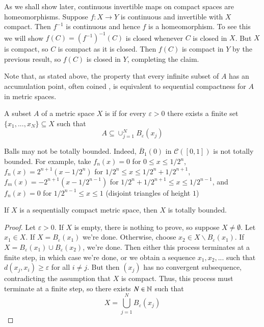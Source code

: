 \begin{eg}
    As we shall show later, continuous invertible maps on compact spaces are homeomorphisms. Suppose $f:X\rightarrow Y$ is continuous and invertible with $X$ compact. Then $f^{-1}$ is continuous and hence $f$ is a homeomorphism. To see this we will show $f(C) = (f^{-1})^{-1}(C)$ is closed whenever $C$ is closed in $X$. But $X$ is compact, so $C$ is compact as it is closed. Then $f(C)$ is compact in $Y$ by the previous result, so $f(C)$ is closed in $Y$, completing the claim.
\end{eg}

Note that, as stated above, the property that every infinite subset of $A$ has an accumulation point, often coined , is equivalent to sequential compactness for $A$ in metric spaces.

\begin{defn}
    A subset $A$ of a metric space $X$ is  if for every $\varepsilon > 0$ there exists a finite set $\{x_1,...,x_N\} \subseteq X$ such that \begin{equation*}
        A \subseteq \cup_{j=1}^NB_{\varepsilon}(x_j)
    \end{equation*}
\end{defn}

\begin{eg}
    Balls may not be totally bounded. Indeed, $\overline{B}_1(0)$ in $\mathcal{C}([0,1])$ is not totally bounded. For example, take $f_n(x) = 0$ for $0 \leq x \leq 1/2^n$, $f_n(x) = 2^{n+1}(x-1/2^n)$ for $1/2^n \leq x \leq 1/2^n+1/2^{n+1}$, $f_m(x) = -2^{n+1}(x-1/2^{n-1})$ for $1/2^n+1/2^{n+1} \leq x \leq 1/2^{n-1}$, and $f_n(x) = 0$ for $1/2^{n-1}\leq x\leq 1$ (disjoint triangles of height $1$)
\end{eg}


\begin{prop}\label{prop:2.3.1}
    If $X$ is a sequentially compact metric space, then $X$ is totally bounded.
\end{prop}
\begin{proof}
    Let $\varepsilon > 0$. If $X$ is empty, there is nothing to prove, so suppose $X \neq \emptyset$. Let $x_1 \in X$. If $X = B_{\varepsilon}(x_1)$ we're done. Otherwise, choose $x_2 \in X\backslash B_{\varepsilon}(x_1)$. If $X = B_{\varepsilon}(x_1)\cup B_{\varepsilon}(x_2)$, we're done. Then either this process terminates at a finite step, in which case we're done, or we obtain a sequence $x_1,x_2,...$ such that $d(x_j,x_i) \geq \varepsilon$ for all $i \neq j$. But then $(x_j)$ has no convergent subsequence, contradicting the assumption that $X$ is compact. Thus, this process must terminate at a finite step, so there exists $N \in \mathbb N$ such that $$X  = \bigcup_{j=1}^NB_{\varepsilon}(x_j)$$
\end{proof}

